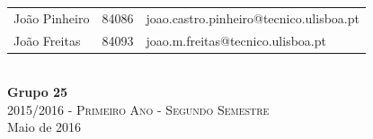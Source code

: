 \documentclass[12pt]{article}
\begin{document}
\begin{titlepage}
\begin{minipage}{0.9\textwidth}
\begin{flushleft}
\begin{tabular}{l l l}
			João Pinheiro & 84086 & \normalsize joao.castro.pinheiro@tecnico.ulisboa.pt \\ 
			João Freitas & 84093 & \normalsize joao.m.freitas@tecnico.ulisboa.pt\\ 
			
		\end{tabular}
	\end{flushleft}
\end{minipage}\\[0.3cm]


{\bfseries Grupo 25}\\[1cm]
\large\textsc{ 2015/2016 - Primeiro Ano - Segundo Semestre}\\
\large Maio de 2016\\[1cm]


\end{titlepage}
\end{document}
